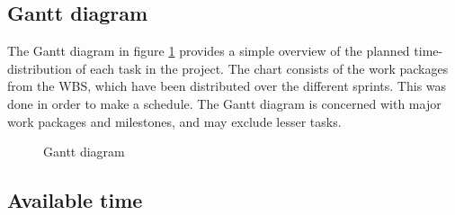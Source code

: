 \subsection{Gantt diagram}
\label{subsec:process_and_methodology-resource_management-gantt_diagram}

The Gantt diagram in figure \ref{fig:gantt} provides a simple overview of the planned time-distribution of each task in the project. The chart consists of the work packages from the WBS, which have been distributed over the different sprints. This was done in order to make a schedule. The Gantt diagram is concerned with major work packages and milestones, and may exclude lesser tasks.

\begin{center}
  \begin{figure}[ht!]
    \caption{Gantt diagram}
    \label{fig:gantt}
  \end{figure}
\end{center}

\subsection{Available time}
\label{subsec:process_and_methodology-resource_management-available_time}

